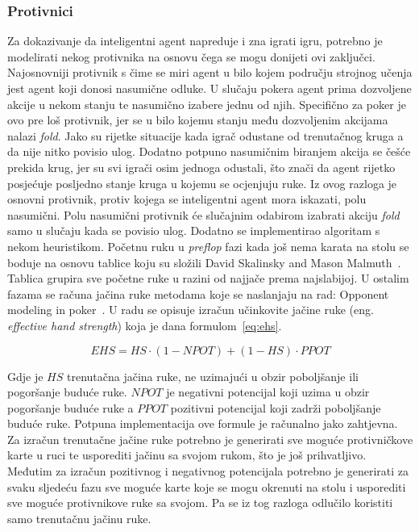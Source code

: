 \subsubsection{Protivnici}
Za dokazivanje da inteligentni agent napreduje i zna igrati igru, potrebno je modelirati nekog protivnika na osnovu čega se mogu donijeti ovi zaključci. Najosnovniji protivnik s čime se miri agent u bilo kojem području strojnog učenja jest agent koji donosi nasumične odluke. U slučaju pokera agent prima dozvoljene akcije u nekom stanju te nasumično izabere jednu od njih. Specifično za poker je ovo pre loš protivnik, jer se u bilo kojemu stanju među dozvoljenim akcijama nalazi \textit{fold}. Jako su rijetke situacije kada igrač odustane od trenutačnog kruga a da nije nitko povisio ulog. Dodatno potpuno nasumičnim biranjem akcija se češće prekida krug, jer su svi igrači osim jednoga odustali, što znači da agent rijetko posjećuje posljedno stanje kruga u kojemu se ocjenjuju ruke. Iz ovog razloga je osnovni protivnik, protiv kojega se inteligentni agent mora iskazati, polu nasumični. Polu nasumični protivnik će slučajnim odabirom izabrati akciju \textit{fold} samo u slučaju kada se povisio ulog. Dodatno se implementirao algoritam s nekom heuristikom. Početnu ruku u \textit{preflop} fazi kada još nema karata na stolu se boduje na osnovu tablice koju su složili David Skalinsky and Mason Malmuth~\cite{starting_hand_groups}. Tablica grupira sve početne ruke u razini od najjače prema najslabijoj. U ostalim fazama se računa jačina ruke metodama koje se naslanjaju na rad: Opponent modeling in poker~\cite{EHS}. U radu se opisuje izračun učinkovite jačine ruke (eng. \textit{effective hand strength}) koja je dana formulom~\ref{eq:ehs}.

\begin{equation}\label{eq:ehs}
EHS = HS \cdot (1 - NPOT) + (1 - HS) \cdot PPOT
\end{equation}

Gdje je $HS$ trenutačna jačina ruke, ne uzimajući u obzir poboljšanje ili pogoršanje buduće ruke. $NPOT$ je negativni potencijal koji uzima u obzir pogoršanje buduće ruke a $PPOT$ pozitivni potencijal koji zadrži poboljšanje buduće ruke. Potpuna implementacija ove formule je računalno jako zahtjevna. Za izračun trenutačne jačine ruke potrebno je generirati sve moguće protivničkove karte u ruci te usporediti jačinu sa svojom rukom, što je još prihvatljivo. Međutim za izračun pozitivnog i negativnog potencijala potrebno je generirati za svaku sljedeću fazu sve moguće karte koje se mogu okrenuti na stolu i usporediti sve moguće protivnikove ruke sa svojom. Pa se iz tog razloga odlučilo koristiti samo trenutačnu jačinu ruke.

